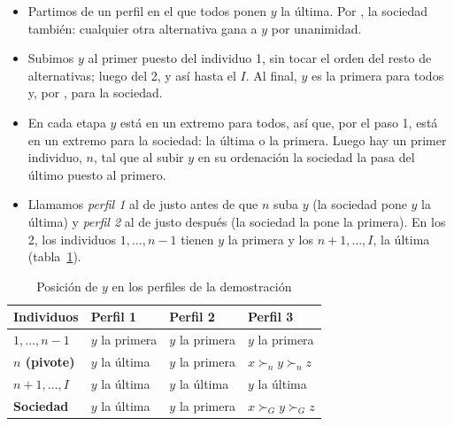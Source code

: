 \documentclass[11pt]{article}
\begin{document}
\begin{itemize}
\item Partimos de un perfil en el que todos ponen $y$ la última. Por , la sociedad también: cualquier otra alternativa gana a $y$ por unanimidad.
\item Subimos $y$ al primer puesto del individuo 1, sin tocar el orden del resto de alternativas; luego del 2, y así hasta el $I$. Al final, $y$ es la primera para todos y, por , para la sociedad.
\item En cada etapa $y$ está en un extremo para todos, así que, por el paso 1, está en un extremo para la sociedad: la última o la primera. Luego hay un primer individuo, $n$, tal que al subir $y$ en su ordenación la sociedad la pasa del último puesto al primero.
\item Llamamos \emph{perfil 1} al de justo antes de que $n$ suba $y$ (la sociedad pone $y$ la última) y \emph{perfil 2} al de justo después (la sociedad la pone la primera). En los 2, los individuos $1,\dots,n-1$ tienen $y$ la primera y los $n+1,\dots,I$, la última (tabla~\ref{tab:perfiles-arrow}).\findemo
\end{itemize}

\begin{table}[H]
\centering
\caption{Posición de $y$ en los perfiles de la demostración}\label{tab:perfiles-arrow}
\renewcommand{\arraystretch}{1.25}
\begin{tabular}{>{\raggedright\arraybackslash}m{4.2cm}>{\centering\arraybackslash}m{3cm}>{\centering\arraybackslash}m{3cm}>{\centering\arraybackslash}m{3.6cm}}
\toprule
\rowcolor{tceeazulpalido}\textbf{Individuos} & \textbf{Perfil 1} & \textbf{Perfil 2} & \textbf{Perfil 3}\\
\midrule
\textcolor{tceemorado}{\textbf{$1,\dots,n-1$}} & $y$ la primera & $y$ la primera & $y$ la primera\\
\textcolor{tceemorado}{\textbf{$n$ (pivote)}} & $y$ la última & $y$ la primera & $x\succ_ny\succ_nz$\\
\textcolor{tceemorado}{\textbf{$n+1,\dots,I$}} & $y$ la última & $y$ la última & $y$ la última\\
\addlinespace[0.3em]
\textcolor{tceemorado}{\textbf{Sociedad}} & $y$ la última & $y$ la primera & $x\succ_Gy\succ_Gz$\\
\bottomrule
\end{tabular}
\end{table}
\end{document}
